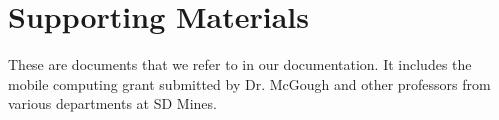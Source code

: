 \chapter{Supporting Materials}
\label{sec:support}

These are documents that we refer to in our documentation. 
It includes the mobile computing grant submitted by Dr. McGough and 
other professors from various departments at SD Mines.


